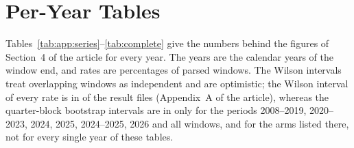 \section{Per-Year Tables}
\label{sup:tables}

Tables~\ref{tab:app:series}--\ref{tab:complete} give the numbers behind the figures of Section~4 of the article for every year. The years are the calendar years of the window end, and rates are percentages of parsed windows. The Wilson intervals treat overlapping windows as independent and are optimistic; the Wilson interval of every rate is in  of the result files (Appendix~A of the article), whereas the quarter-block bootstrap intervals are in  only for the periods 2008--2019, 2020--2023, 2024, 2025, 2024--2025, 2026 and all windows, and for the arms listed there, not for every single year of these tables.

